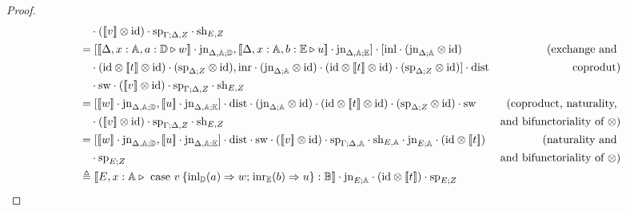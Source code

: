 \documentclass[10pt,a4paper]{amsart}
\theoremstyle{definition}
\theoremstyle{definition}
\theoremstyle{definition}
\theoremstyle{definition}
\theoremstyle{definition}
\theoremstyle{definition}
\begin{document}
\begin{proof}
\begin{align*}
  &  \hspace{10pt} \cdot ([\![v]\!] \otimes \text{id})  \cdot \text{sp}_{\Gamma; \Delta, Z} \cdot \text{sh}_{E,Z} \\
  & = [[\![ \Delta  , x:\typeA ,  a:\typeD \vljud w]\!] \cdot \text{jn}_{\Delta, \typeA; \typeD}, [\![ \Delta  , x:\typeA ,  b:\typeE \vljud u]\!] \cdot \text{jn}_{\Delta, \typeA; \typeE}]  \cdot [\inl  \cdot  (\text{jn}_{\Delta; \typeA} \otimes \text{id})     & {(\text{exchange and }}  \\
  & \hspace{10pt} \cdot (\text{id} \otimes [\![t]\!]  \otimes \text{id})  \cdot (\text{sp}_{\Delta; Z} \otimes \text{id}),\inr \cdot (\text{jn}_{\Delta; \typeA} \otimes \text{id})   \cdot (\text{id} \otimes [\![t]\!]  \otimes \text{id}) \cdot  (\text{sp}_{\Delta; Z} \otimes \text{id})] \cdot \text{dist}  & { \text{coprodut})}\\
  & \hspace{10pt} \cdot \text{sw} \cdot ([\![v]\!] \otimes \text{id})  \cdot \text{sp}_{\Gamma; \Delta, Z} \cdot \text{sh}_{E,Z} \\
  &= [[\![w]\!] \cdot \text{jn}_{\Delta, \typeA; \typeD}, [\![u]\!] \cdot \text{jn}_{\Delta, \typeA; \typeE}]  \cdot \text{dist} \cdot (\text{jn}_{\Delta; \typeA} \otimes \text{id})   \cdot (\text{id} \otimes [\![t]\!]  \otimes \text{id}) \cdot  (\text{sp}_{\Delta; Z} \otimes \text{id}) \cdot \text{sw}  & {(\text{coproduct, naturality, }}  \\
  & \hspace{10pt} \cdot ([\![v]\!] \otimes \text{id}) \cdot \text{sp}_{\Gamma; \Delta, Z} \cdot \text{sh}_{E,Z}  & {\text{and bifunctoriality of } \otimes})  \\
  & =  [[\![w]\!] \cdot \text{jn}_{\Delta, \typeA; \typeD}, [\![u]\!] \cdot \text{jn}_{\Delta, \typeA; \typeE}]  \cdot \text{dist} \cdot \text{sw}  \cdot ([\![v  ]\!] \otimes \text{id}) \cdot \text{sp}_{\Gamma; \Delta, \typeA} \cdot \text{sh}_{E,\typeA} \cdot \text{jn}_{E; \typeA} \cdot (\text{id} \otimes [\![ t  ]\!] ) & {(\text{naturality and  }} \\
  & \hspace{10pt} \cdot \text{sp}_{E;Z} &{\text{and bifunctoriality of } \otimes})  \\ 
  & \triangleq  [\![E,  x:\typeA \vljud \text{ case } v \hspace{2pt}  \{\text{inl}_{\typeD} (a) \Rightarrow w ; \hspace{1pt} \text{inr}_{\typeE} (b) \Rightarrow u\}: \typeB]\!] \cdot \text{jn}_{E; \typeA} \cdot (\text{id} \otimes [\![ t ]\!] ) \cdot \text{sp}_{E;Z}
\end{align*}
\end{proof}
\end{document}
